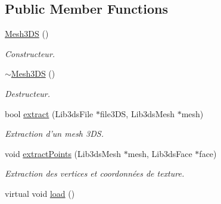 \subsection*{Public Member Functions}
\begin{DoxyCompactItemize}
\item 
\hypertarget{classMesh3DS_abdfac0ddfc9dd72b5bc3504996c07a1c}{\hyperlink{classMesh3DS_abdfac0ddfc9dd72b5bc3504996c07a1c}{Mesh3\+D\+S} ()}\label{classMesh3DS_abdfac0ddfc9dd72b5bc3504996c07a1c}

\begin{DoxyCompactList}\small\item\em Constructeur. \end{DoxyCompactList}\item 
\hypertarget{classMesh3DS_a56ab33cfc6d63a288226993f96b85af8}{\hyperlink{classMesh3DS_a56ab33cfc6d63a288226993f96b85af8}{$\sim$\+Mesh3\+D\+S} ()}\label{classMesh3DS_a56ab33cfc6d63a288226993f96b85af8}

\begin{DoxyCompactList}\small\item\em Destructeur. \end{DoxyCompactList}\item 
\hypertarget{classMesh3DS_a15725546099ea3a351229d875738803d}{bool \hyperlink{classMesh3DS_a15725546099ea3a351229d875738803d}{extract} (Lib3ds\+File $\ast$file3\+D\+S, Lib3ds\+Mesh $\ast$mesh)}\label{classMesh3DS_a15725546099ea3a351229d875738803d}

\begin{DoxyCompactList}\small\item\em Extraction d'un mesh 3\+D\+S. \end{DoxyCompactList}\item 
\hypertarget{classMesh3DS_a0a4b9d9c4be4cd15edb205c52939dd9b}{void \hyperlink{classMesh3DS_a0a4b9d9c4be4cd15edb205c52939dd9b}{extract\+Points} (Lib3ds\+Mesh $\ast$mesh, Lib3ds\+Face $\ast$face)}\label{classMesh3DS_a0a4b9d9c4be4cd15edb205c52939dd9b}

\begin{DoxyCompactList}\small\item\em Extraction des vertices et coordonnées de texture. \end{DoxyCompactList}\item 
\hypertarget{classMesh3DS_a86b0028e6af06db5388bba8d962de91f}{virtual void \hyperlink{classMesh3DS_a86b0028e6af06db5388bba8d962de91f}{load} ()}\label{classMesh3DS_a86b0028e6af06db5388bba8d962de91f}


\end{DoxyCompactItemize}
